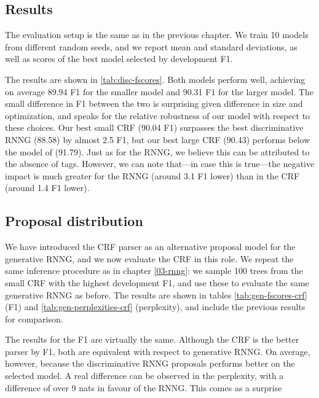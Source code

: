   \subsection{Results}
    The evaluation setup is the same as in the previous chapter. We train 10 models from different random seeds, and we report mean and standard deviations, as well as scores of the best model selected by development F1.

    

    The results are shown in \ref{tab:disc-fscores}. Both models perform well, achieving on average 89.94 F1 for the smaller model and 90.31 F1 for the larger model. The small difference in F1 between the two is surprising given difference in size and optimization, and speaks for the relative robustness of our model with respect to these choices. Our best small CRF (90.04 F1) surpasses the best discriminative RNNG (88.58) by almost 2.5 F1, but our best large CRF (90.43) performs below the model of \citet{stern2017minimal} (91.79). Just as for the RNNG, we believe this can be attributed to the absence of tags. However, we can note that---in case this is true---the negative impact is much greater for the RNNG (around 3.1 F1 lower) than in the CRF (around 1.4 F1 lower).

  \subsection{Proposal distribution}
    We have introduced the CRF parser as an alternative proposal model for the generative RNNG, and we now evaluate the CRF in this role. We repeat the same inference procedure as in chapter \ref{03-rnng}: we sample 100 trees from the small CRF with the highest development F1, and use these to evaluate the same generative RNNG as before. The results are shown in tables \ref{tab:gen-fscores-crf} (F1) and \ref{tab:gen-perplexities-crf} (perplexity), and include the previous results for comparison.

    

    

    The results for the F1 are virtually the same. Although the CRF is the better parser by F1, both are equivalent with respect to generative RNNG. On average, however, because the discriminative RNNG proposals performs better on the selected model. A real difference can be observed in the perplexity, with a difference of over 9 nats in favour of the RNNG. This comes as a surprise

